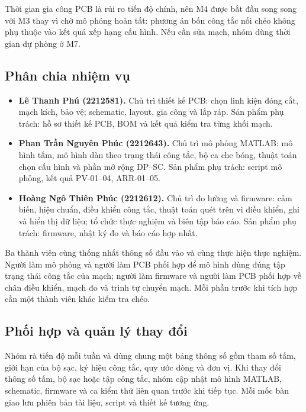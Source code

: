 Thời gian gia công PCB là rủi ro tiến độ chính, nên M4 được bắt đầu song song với M3 thay vì chờ mô phỏng hoàn tất: phương án bốn công tắc nối chéo không phụ thuộc vào kết quả xếp hạng cấu hình. Nếu cần sửa mạch, nhóm dùng thời gian dự phòng ở M7.

\subsection{Phân chia nhiệm vụ}

\begin{itemize}
    \item \textbf{Lê Thanh Phú (2212581).} Chủ trì thiết kế PCB: chọn linh kiện đóng cắt, mạch kích, bảo vệ; schematic, layout, gia công và lắp ráp. Sản phẩm phụ trách: hồ sơ thiết kế PCB, BOM và kết quả kiểm tra từng khối mạch.
    \item \textbf{Phan Trần Nguyên Phúc (2212643).} Chủ trì mô phỏng MATLAB: mô hình tấm, mô hình dàn theo trạng thái công tắc, bộ ca che bóng, thuật toán chọn cấu hình và phần mở rộng DP--SC. Sản phẩm phụ trách: script mô phỏng, kết quả PV-01--04, ARR-01--05.
    \item \textbf{Hoàng Ngô Thiên Phúc (2212612).} Chủ trì đo lường và firmware: cảm biến, hiệu chuẩn, điều khiển công tắc, thuật toán quét trên vi điều khiển, ghi và hiển thị dữ liệu; tổ chức thực nghiệm và biên tập báo cáo. Sản phẩm phụ trách: firmware, nhật ký đo và báo cáo hợp nhất.
\end{itemize}

Ba thành viên cùng thống nhất thông số đầu vào và cùng thực hiện thực nghiệm. Người làm mô phỏng và người làm PCB phối hợp để mô hình dùng đúng tập trạng thái công tắc của mạch; người làm firmware và người làm PCB phối hợp về chân điều khiển, mạch đo và trình tự chuyển mạch. Mỗi phần trước khi tích hợp cần một thành viên khác kiểm tra chéo.

\subsection{Phối hợp và quản lý thay đổi}

Nhóm rà tiến độ mỗi tuần và dùng chung một bảng thông số gồm tham số tấm, giới hạn của bộ sạc, ký hiệu công tắc, quy ước dòng và đơn vị. Khi thay đổi thông số tấm, bộ sạc hoặc tập công tắc, nhóm cập nhật mô hình MATLAB, schematic, firmware và ca kiểm thử liên quan trước khi tiếp tục. Mỗi mốc bàn giao lưu phiên bản tài liệu, script và thiết kế tương ứng.
